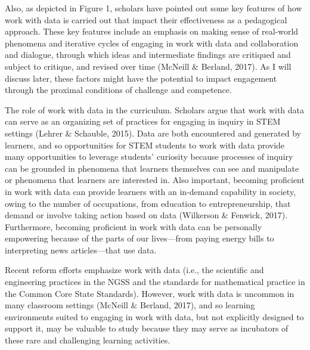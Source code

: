 \documentclass[]{book}
\theoremstyle{definition}
\theoremstyle{definition}
\theoremstyle{definition}
\theoremstyle{remark}
\begin{document}
Also, as depicted in Figure 1, scholars have pointed out some key
features of how work with data is carried out that impact their
effectiveness as a pedagogical approach. These key features include an
emphasis on making sense of real-world phenomena and iterative cycles of
engaging in work with data and collaboration and dialogue, through which
ideas and intermediate findings are critiqued and subject to critique,
and revised over time (McNeill \& Berland, 2017). As I will discuss
later, these factors might have the potential to impact engagement
through the proximal conditions of challenge and competence.

The role of work with data in the curriculum. Scholars argue that work
with data can serve as an organizing set of practices for engaging in
inquiry in STEM settings (Lehrer \& Schauble, 2015). Data are both
encountered and generated by learners, and so opportunities for STEM
students to work with data provide many opportunities to leverage
students' curiosity because processes of inquiry can be grounded in
phenomena that learners themselves can see and manipulate or phenomena
that learners are interested in. Also important, becoming proficient in
work with data can provide learners with an in-demand capability in
society, owing to the number of occupations, from education to
entrepreneurship, that demand or involve taking action based on data
(Wilkerson \& Fenwick, 2017). Furthermore, becoming proficient in work
with data can be personally empowering because of the parts of our
lives---from paying energy bills to interpreting news articles---that
use data.

Recent reform efforts emphasize work with data (i.e., the scientific and
engineering practices in the NGSS and the standards for mathematical
practice in the Common Core State Standards). However, work with data is
uncommon in many classroom settings (McNeill \& Berland, 2017), and so
learning environments suited to engaging in work with data, but not
explicitly designed to support it, may be valuable to study because they
may serve as incubators of these rare and challenging learning
activities.
\end{document}
